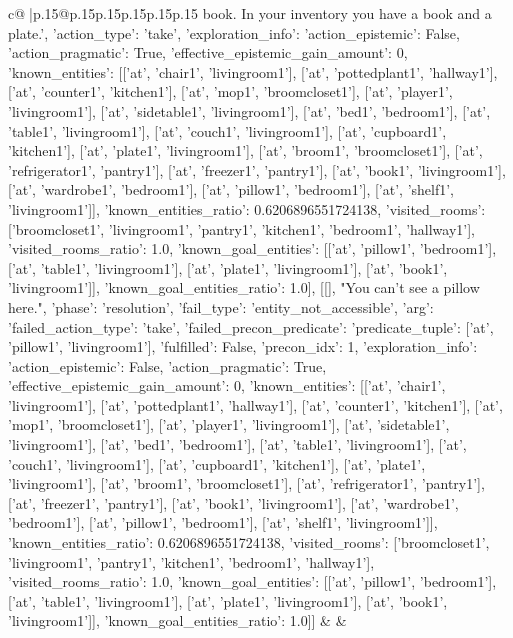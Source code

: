 \documentclass{article}
\begin{document}
{\begin{supertabular}{c@{$\;$}|p{.15\linewidth}@{}p{.15\linewidth}p{.15\linewidth}p{.15\linewidth}p{.15\linewidth}p{.15\linewidth}}
{{{book. In your inventory you have a book and a plate.', {'action_type': 'take', 'exploration_info': {'action_epistemic': False, 'action_pragmatic': True, 'effective_epistemic_gain_amount': 0, 'known_entities': [['at', 'chair1', 'livingroom1'], ['at', 'pottedplant1', 'hallway1'], ['at', 'counter1', 'kitchen1'], ['at', 'mop1', 'broomcloset1'], ['at', 'player1', 'livingroom1'], ['at', 'sidetable1', 'livingroom1'], ['at', 'bed1', 'bedroom1'], ['at', 'table1', 'livingroom1'], ['at', 'couch1', 'livingroom1'], ['at', 'cupboard1', 'kitchen1'], ['at', 'plate1', 'livingroom1'], ['at', 'broom1', 'broomcloset1'], ['at', 'refrigerator1', 'pantry1'], ['at', 'freezer1', 'pantry1'], ['at', 'book1', 'livingroom1'], ['at', 'wardrobe1', 'bedroom1'], ['at', 'pillow1', 'bedroom1'], ['at', 'shelf1', 'livingroom1']], 'known_entities_ratio': 0.6206896551724138, 'visited_rooms': ['broomcloset1', 'livingroom1', 'pantry1', 'kitchen1', 'bedroom1', 'hallway1'], 'visited_rooms_ratio': 1.0, 'known_goal_entities': [['at', 'pillow1', 'bedroom1'], ['at', 'table1', 'livingroom1'], ['at', 'plate1', 'livingroom1'], ['at', 'book1', 'livingroom1']], 'known_goal_entities_ratio': 1.0}}], [[], "You can't see a pillow here.", {'phase': 'resolution', 'fail_type': 'entity_not_accessible', 'arg': {'failed_action_type': 'take', 'failed_precon_predicate': {'predicate_tuple': ['at', 'pillow1', 'livingroom1'], 'fulfilled': False, 'precon_idx': 1}}, 'exploration_info': {'action_epistemic': False, 'action_pragmatic': True, 'effective_epistemic_gain_amount': 0, 'known_entities': [['at', 'chair1', 'livingroom1'], ['at', 'pottedplant1', 'hallway1'], ['at', 'counter1', 'kitchen1'], ['at', 'mop1', 'broomcloset1'], ['at', 'player1', 'livingroom1'], ['at', 'sidetable1', 'livingroom1'], ['at', 'bed1', 'bedroom1'], ['at', 'table1', 'livingroom1'], ['at', 'couch1', 'livingroom1'], ['at', 'cupboard1', 'kitchen1'], ['at', 'plate1', 'livingroom1'], ['at', 'broom1', 'broomcloset1'], ['at', 'refrigerator1', 'pantry1'], ['at', 'freezer1', 'pantry1'], ['at', 'book1', 'livingroom1'], ['at', 'wardrobe1', 'bedroom1'], ['at', 'pillow1', 'bedroom1'], ['at', 'shelf1', 'livingroom1']], 'known_entities_ratio': 0.6206896551724138, 'visited_rooms': ['broomcloset1', 'livingroom1', 'pantry1', 'kitchen1', 'bedroom1', 'hallway1'], 'visited_rooms_ratio': 1.0, 'known_goal_entities': [['at', 'pillow1', 'bedroom1'], ['at', 'table1', 'livingroom1'], ['at', 'plate1', 'livingroom1'], ['at', 'book1', 'livingroom1']], 'known_goal_entities_ratio': 1.0}}]] 
	  } 
	   } 
	   } 
	 & & \\ 
 


\end{supertabular}}
\end{document}
